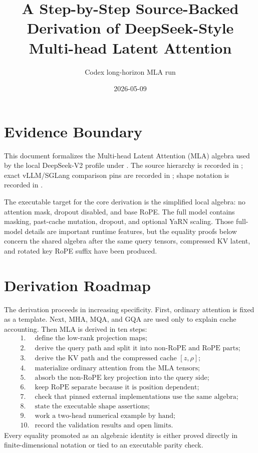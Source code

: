 \documentclass[11pt]{article}
\title{A Step-by-Step Source-Backed Derivation of DeepSeek-Style Multi-head Latent Attention}
\author{Codex long-horizon MLA run}
\date{2026-05-09}
\begin{document}
\maketitle

\section{Evidence Boundary}

This document formalizes the Multi-head Latent Attention (MLA) algebra used by
the local DeepSeek-V2 profile under
.  The source hierarchy is recorded in
; exact vLLM/SGLang comparison pins are recorded
in ; shape notation is recorded in
.

The executable target for the core derivation is the simplified local algebra:
no attention mask, dropout disabled, and base RoPE.  The full model contains
masking, past-cache mutation, dropout, and optional YaRN scaling.  Those
full-model details are important runtime features, but the equality proofs below
concern the shared algebra after the same query tensors, compressed KV latent,
and rotated key RoPE suffix have been produced.

\section{Derivation Roadmap}

The derivation proceeds in increasing specificity.  First, ordinary attention
is fixed as a template.  Next, MHA, MQA, and GQA are used only to explain cache
accounting.  Then MLA is derived in ten steps:
\[
\begin{array}{rl}
1. & \text{define the low-rank projection maps;}\\
2. & \text{derive the query path and split it into non-RoPE and RoPE parts;}\\
3. & \text{derive the KV path and the compressed cache }[z,\rho];\\
4. & \text{materialize ordinary attention from the MLA tensors;}\\
5. & \text{absorb the non-RoPE key projection into the query side;}\\
6. & \text{keep RoPE separate because it is position dependent;}\\
7. & \text{check that pinned external implementations use the same algebra;}\\
8. & \text{state the executable shape assertions;}\\
9. & \text{work a two-head numerical example by hand;}\\
10. & \text{record the validation results and open limits.}
\end{array}
\]
Every equality promoted as an algebraic identity is either proved directly in
finite-dimensional notation or tied to an executable parity check.
\end{document}
